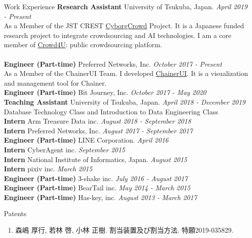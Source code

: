 \documentclass{resume} %
\begin{document}
\begin{rSection}{Work Experience}
{\bf Research Assistant} University of Tsukuba, Japan. \hfill {\em April 2019 - Present}
\\ As a Member of the JST CREST \href{https://www.dl.soc.i.kyoto-u.ac.jp/system/wp-content/uploads/2019/03/hcompWS18www.pdf}{CyborgCrowd} Project. It is a Japanese funded research project to integrate crowdsourcing and AI technologies. I am a core member of \href{https://crowd4u.org}{Crowd4U}: public crowdsourcing platform.
\\\\
{\bf Engineer (Part-time) } Preferred Networks, Inc. \hfill {\em October 2017 - Present}
\\ As a Member of the ChainerUI Team. I developed \href{https://github.com/chainer/chainerui}{ChainerUI}. It is a visualization and management tool for Chainer.
\\
{\bf Engineer (Part-time) } Bit Journey, Inc. \hfill {\em October 2017 - May 2020} 
\\
{\bf Teaching Assistant } University of Tsukuba, Japan. \hfill {\em April 2018 - December 2019} 
\\ Database Technology Class and Introduction to Data Engineering Class
\\
{\bf Intern } Arm Treasure Data inc. \hfill {\em August 2018 - September 2018}
\\
{\bf Intern } Preferred Networks, Inc. \hfill {\em August 2017 - September 2017} 
\\
{\bf Engineer (Part-time) } LINE Corporation. \hfill {\em April 2016}
\\
{\bf Intern } CyberAgent inc. \hfill {\em September 2015}
\\
{\bf Intern } National Institute of Informatics, Japan. \hfill {\em August 2015}
\\
{\bf Intern } pixiv inc. \hfill {\em March 2015}
\\
{\bf Engineer (Part-time) } 3-shake inc. \hfill {\em July 2016 - August 2017}
\\
{\bf Engineer (Part-time) } BearTail inc. \hfill {\em May 2014 - March 2015}
\\
{\bf Engineer (Part-time) } Has-key, inc. \hfill {\em August 2013 - March 2017}
\end{rSection}



\begin{rSection}{Patents}
  \begin{enumerate}
    \setcounter{enumi}{0}
    \item 森嶋 厚行, 若林 啓, 小林 正樹. 割当装置及び割当方法. 特願2019-035829.
  \end{enumerate}
\end{rSection}
\end{document}
